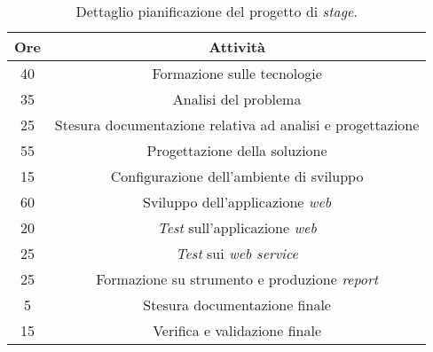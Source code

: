 \begin{center}
	\begin{longtable}{|c|c|}
		\caption{Dettaglio pianificazione del progetto di \textit{stage}.}\\		
		\hline
		\textbf{Ore} & \textbf{Attività}\\
		\hline
		40 & Formazione sulle tecnologie\\
		\hline
		35 & Analisi del problema\\
		\hline
		25 & Stesura documentazione relativa ad analisi e progettazione\\
		\hline
		55 & Progettazione della soluzione\\
		\hline
		15 & Configurazione dell'ambiente di sviluppo\\
		\hline
		60 & Sviluppo dell'applicazione \textit{web}\\
		\hline
		20 & \textit{Test} sull'applicazione \textit{web}\\
		\hline
		25 & \textit{Test} sui \textit{web service}\\
		\hline
		25 & Formazione su strumento e produzione \textit{report}\\
		\hline
		5 & Stesura documentazione finale\\
		\hline
		15 & Verifica e validazione finale\\
		\hline
	\end{longtable}
\end{center}



